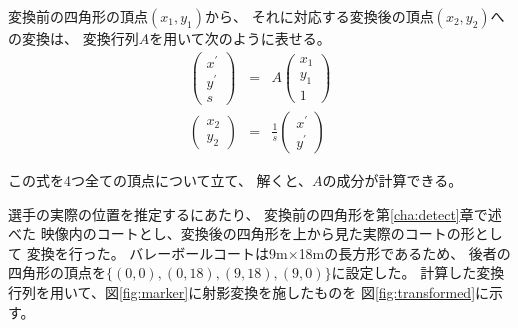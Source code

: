\documentclass[a4j, fleqn, 12pt]{jsreport}
\begin{document}
        変換前の四角形の頂点$(x_1, y_1)$から、
        それに対応する変換後の頂点$(x_2, y_2)$への変換は、
        変換行列$A$を用いて次のように表せる。
        \begin{eqnarray*}
            \left(
                \begin{array}{c}
                    x^\prime \\
                    y^\prime \\
                    s
                \end{array} 
            \right) &=& A \left(
                \begin{array}{c}
                    x_1 \\
                    y_1 \\
                    1
                \end{array}
            \right) \\
            \left(
                \begin{array}{c}
                    x_2 \\
                    y_2
                \end{array} 
            \right) &=& \frac{1}{s} \left(
                \begin{array}{c}
                    x^\prime \\
                    y^\prime
                \end{array} 
            \right)
        \end{eqnarray*}

        この式を4つ全ての頂点について立て、
        解くと、$A$の成分が計算できる。

        選手の実際の位置を推定するにあたり、
        変換前の四角形を第\ref{cha:detect}章で述べた
        映像内のコートとし、変換後の四角形を上から見た実際のコートの形として
        変換を行った。
        バレーボールコートは9m$\times$18mの長方形であるため、
        後者の四角形の頂点を$\{(0, 0), (0, 18), (9, 18), (9, 0)\}$に設定した。
        計算した変換行列を用いて、図\ref{fig:marker}に射影変換を施したものを
        図\ref{fig:transformed}に示す。
\end{document}
